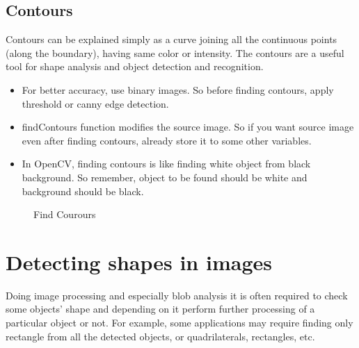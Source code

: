\begin{enumerate}
\section{Contours}
Contours can be explained simply as a curve joining all the continuous points (along the boundary), having same color or intensity. The contours are a useful tool for shape analysis and object detection and recognition.
\begin{itemize}
\item For better accuracy, use binary images. So before finding contours, apply threshold or canny edge detection.
\item findContours function modifies the source image. So if you want source image even after finding contours, already store it to some other variables.
\item In OpenCV, finding contours is like finding white object from black background. So remember, object to be found should be white and background should be black.
\end{itemize}
\begin{figure}[H]
\centering
{}
\caption {Find Courours}
\label {fig:Amino_Acid}
\end{figure}
\end{enumerate}
\section{Detecting shapes in images}
Doing image processing and especially blob analysis it is often required to check some objects' shape and depending on it perform further processing of a particular object or not. For example, some applications may require finding only rectangle from all the detected objects, or quadrilaterals, rectangles, etc.
